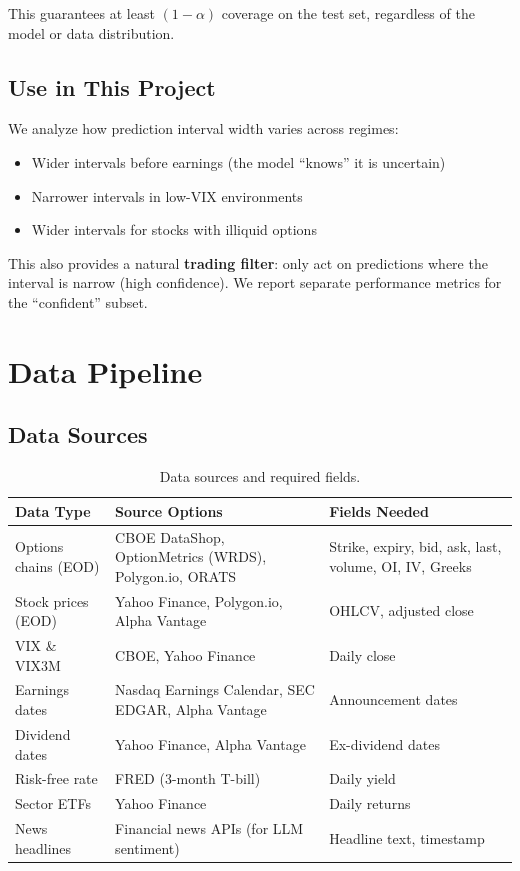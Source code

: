 \documentclass[11pt,a4paper]{article}
\begin{document}
This guarantees at least $(1-\alpha)$ coverage on the test set, regardless of the model or data distribution.

\subsection{Use in This Project}

We analyze how prediction interval width varies across regimes:
\begin{itemize}[nosep]
    \item Wider intervals before earnings (the model ``knows'' it is uncertain)
    \item Narrower intervals in low-VIX environments
    \item Wider intervals for stocks with illiquid options
\end{itemize}

This also provides a natural \textbf{trading filter}: only act on predictions where the interval is narrow (high confidence). We report separate performance metrics for the ``confident'' subset.


\section{Data Pipeline}

\subsection{Data Sources}

\begin{table}[H]
\centering
\begin{tabularx}{\textwidth}{@{}lXl@{}}
\toprule
\textbf{Data Type} & \textbf{Source Options} & \textbf{Fields Needed} \\
\midrule
Options chains (EOD) & CBOE DataShop, OptionMetrics (WRDS), Polygon.io, ORATS & Strike, expiry, bid, ask, last, volume, OI, IV, Greeks \\
Stock prices (EOD) & Yahoo Finance, Polygon.io, Alpha Vantage & OHLCV, adjusted close \\
VIX \& VIX3M & CBOE, Yahoo Finance & Daily close \\
Earnings dates & Nasdaq Earnings Calendar, SEC EDGAR, Alpha Vantage & Announcement dates \\
Dividend dates & Yahoo Finance, Alpha Vantage & Ex-dividend dates \\
Risk-free rate & FRED (3-month T-bill) & Daily yield \\
Sector ETFs & Yahoo Finance & Daily returns \\
News headlines & Financial news APIs (for LLM sentiment) & Headline text, timestamp \\
\bottomrule
\end{tabularx}
\caption{Data sources and required fields.}
\end{table}
\end{document}
